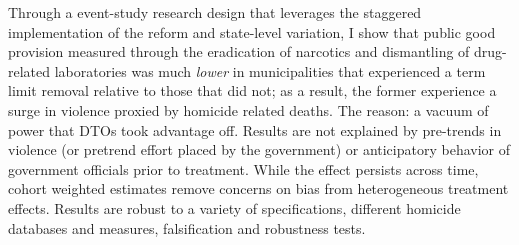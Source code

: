 \documentclass[12pt]{amsart}
\numberwithin{equation}{section}
\theoremstyle{definition}
\theoremstyle{definition}
\theoremstyle{definition}
\begin{document}
   
   
   
Through a event-study research design that leverages the staggered implementation of the reform and state-level variation, I show that public good provision measured through the eradication of narcotics and dismantling of drug-related laboratories was much \emph{lower} in municipalities that experienced a term limit removal relative to those that did not; as a result, the former experience a surge in violence proxied by homicide related deaths. The reason: a vacuum of power that DTOs took advantage off. Results are not explained by pre-trends in violence (or pretrend effort placed by the government) or anticipatory behavior of government officials prior to treatment. While the effect persists across time, cohort weighted estimates remove concerns on bias from heterogeneous treatment effects.  Results are robust to a variety of specifications, different homicide databases and measures, falsification and robustness tests. 
\end{document}
